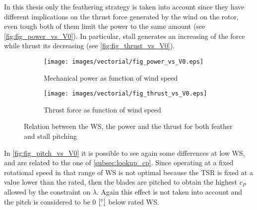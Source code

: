 In this thesis only the feathering strategy is taken into account since they have different implications on the thrust force generated by the wind on the rotor, even tough both of them limit the power to the same amount (see \autoref{fig:fig_power_vs_V0}). In particular, stall generates an increasing of the force while thrust its decreasing (see \autoref{fig:fig_thrust_vs_V0}).
\begin{figure}[htb]
    \centering
    \begin{subfigure}{0.49\textwidth}
    \centering
    \texttt{[image: images/vectorial/fig\_power\_vs\_V0.eps]}
    \caption{Mechanical power as function of wind speed}
    \label{fig:fig_power_vs_V0}
    \end{subfigure}
    \begin{subfigure}{0.49\textwidth}
    \texttt{[image: images/vectorial/fig\_thrust\_vs\_V0.eps]}
    \caption{Thrust force as function of wind speed}
    \label{fig:fig_thrust_vs_V0}
    \end{subfigure}
    \caption{Relation between the \acrshort{WS}, the power and the thrust for both feather and stall pitching}
    \label{fig:P_T_vs_V0}
\end{figure}

In \autoref{fig:fig_pitch_vs_V0} it is possible to see again some differences at low \acrshort{WS}, and are related to the one of \autoref{subsec:lookup_cp}. Since operating at a fixed rotational speed in that range of \acrshort{WS} is not optimal because the \acrshort{TSR} is fixed at a value lower than the rated, then the blades are pitched to obtain the highest $c_P$ allowed by the constraint on $\lambda$. Again this effect is not taken into account and the pitch is considered to be 0 $\left[\si{\degree}\right]$ below rated \acrlong{WS}.
\newpage